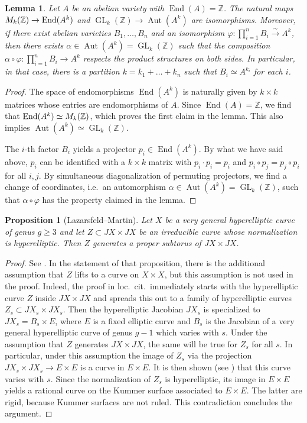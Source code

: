 \documentclass[a4paper,11pt,reqno]{amsart}
\numberwithin{equation}{section}
\theoremstyle{plain}
\newtheorem{lemma}[theorem]{Lemma}
\newtheorem{proposition}[theorem]{Proposition}
\theoremstyle{definition}
\newcommand{\Z}{\mathbb Z}
\let\rm\relax
\newcommand{\rm}[1]{{\mathrm{#1}}}
\newcommand{\End}{\operatorname{End}}
\newcommand{\Aut}{\operatorname{Aut}}
\newcommand{\GL}{\operatorname{GL}}
\renewcommand{\cong}{\simeq}
\begin{document}
\begin{lemma} \label{lem:factor of A}
    Let $A$ be an abelian variety with $\End(A) = \Z$.
    The natural maps $\rm M_k(\Z)\to \End(A^k)$ and $\GL_k(\Z)\to \Aut(A^k)$ are isomorphisms. Moreover, if there exist abelian varieties $B_1,\dots ,B_n$ and an isomorphism $\varphi\colon\prod_{i = 1}^n B_i \stackrel{\sim}\to A^k$, then there exists $\alpha\in \Aut(A^k) = \GL_k(\Z)$ such that the composition $\alpha \circ \varphi\colon\prod_{i = 1}^n B_i\to A^k $ respects the product structures on both sides.
    In particular, in that case, there is a partition $k=k_1+\dots +k_n$ such that $B_i\cong A^{k_i}$ for each $i$.
\end{lemma}
\begin{proof}
The space of endomorphisms $\End(A^k)$ is naturally given by $k\times k$ matrices whose entries are endomorphisms of $A$.
Since $\End(A)=\Z$, we find that $\End(A^k)\cong \rm{M}_k(\Z)$, which proves the first claim in the lemma.
This also implies $\Aut(A^k)\cong \GL_k(\Z)$.

The $i$-th factor $B_i$ yields a projector $p_i\in \End(A ^k)$.
By what we have said above, $p_i$ can be identified with a $k\times k$ matrix with $p_i\cdot p_i=p_i$ and $p_i\circ p_j=p_j\circ p_i$ for all $i,j$.
By simultaneous diagonalization of permuting projectors, we find  a change of coordinates, i.e.\ an automorphism $\alpha\in \Aut(A^k)=\GL_k(\Z)$, such that $\alpha\circ \varphi$ has the property claimed in the lemma. 
\end{proof}

\begin{proposition}[Lazarsfeld--Martin] \label{proposition:lazarsfeldmartin}
Let $X$ be a very general hyperelliptic curve of genus $ g \geq 3$ and let $Z \subset JX \times JX$ be an irreducible curve whose normalization is hyperelliptic. Then $Z$ generates a proper subtorus of $JX \times JX$. 
\end{proposition}
\begin{proof}
See \cite[Proposition 3.1]{lazarsfeld2023measures}. In the statement of that proposition, there is the additional assumption that $Z$ lifts to a curve on $X \times X$, but this assumption is not used in the proof. 
Indeed, the proof in loc.\ cit.\ immediately starts with the hyperelliptic curve $Z$ inside $JX\times JX$ and spreads this out to a family of hyperelliptic curves $Z_s\subset JX_s\times JX_s$.
Then the hyperelliptic Jacobian $JX_s$ is specialized to  $JX_s=B_s\times E$, where $E$ is a fixed elliptic curve and $B_s$ is the Jacobian of a very general hyperelliptic curve of genus $g-1$ which varies with $s$.
Under the assumption that $Z$ generates $JX\times JX$, the same will be true for $Z_s$ for all $s$.
In particular, under this assumption the image of $Z_s$ via the projection $JX_s\times JX_s\to E\times E$ is a curve in $E\times E$.
It is then shown (see \cite[Claim in Section 3]{lazarsfeld2023measures}) that this curve varies with $s$.
Since the normalization of $Z_s$ is hyperelliptic, its image in $E\times E$ yields a rational curve on the Kummer surface associated to $E\times E$.
The latter are rigid, because Kummer surfaces are not ruled.
This contradiction concludes the argument.
\end{proof}
\end{document}
